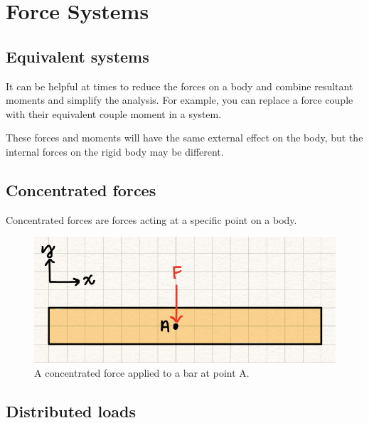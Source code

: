 \section{Force Systems}

\subsection{Equivalent systems}


It can be helpful at times to reduce the forces on a body and combine resultant moments and simplify the analysis. For example, you can replace a force couple with their equivalent couple moment in a system. 

These forces and moments will have the same external effect on the body, but the internal forces on the rigid body may be different. 

\subsection{Concentrated forces}


Concentrated forces are forces acting at a specific point on a body. 

\begin{figure}[!h]
\centering
\includegraphics[angle=0, width=5 in]{ForceSystemsFigures/ConcentratedForce.PNG}
\vspace{-2mm}
\caption{\small A concentrated force applied to a bar at point A.}
\vspace{-3mm}
\label{Fig:ConcLoad}
\end{figure}

\subsection{Distributed loads}

